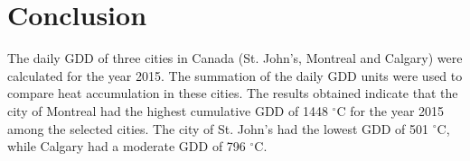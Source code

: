 \documentclass{article}
\begin{document}
\newpage 
\section{Conclusion}
The daily GDD of three cities in Canada (St. John's, Montreal and Calgary) were calculated for the year 2015. The summation of the daily GDD units were used to compare heat accumulation in these cities. The results obtained indicate that the city of Montreal had the highest cumulative GDD of 1448 $^{\circ}$C for the year 2015 among the selected cities. The city of St. John's had the lowest GDD of 501 $^{\circ}$C, while Calgary had a moderate GDD of 796 $^{\circ}$C.



%



\end{document}
